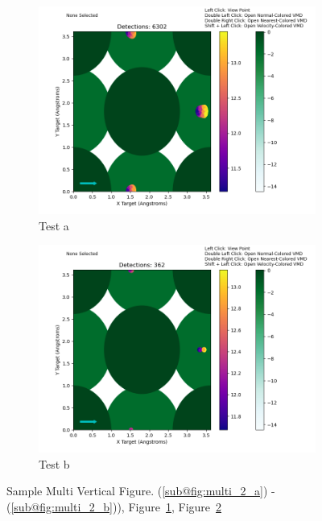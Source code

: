 \documentclass[12pt]{article}
\begin{document}
\begin{figure}[ht]
    \begin{subfigure}{.95\textwidth}
      \centering
      \includegraphics[width=1\linewidth]{fig_1.png}  
      \caption{Test a}
      \label{fig:multi_2_a}
    \end{subfigure}
    \newline
    \begin{subfigure}{.95\textwidth}
      \centering
      \includegraphics[width=1\linewidth]{fig_2.png}  
      \caption{Test b}
      \label{fig:multi_2_b}
    \end{subfigure}
    \caption{Sample Multi Vertical Figure. (\ref{sub@fig:multi_2_a}) - (\ref{sub@fig:multi_2_b})), Figure~\ref{fig:multi_2_a}, Figure~\ref{fig:multi_2_b}}
    \label{fig:multi_2}
\end{figure}
\end{document}
